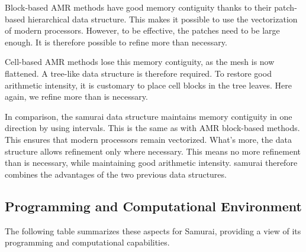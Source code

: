 Block-based AMR methods have good memory contiguity thanks to their patch-based hierarchical data structure. This makes it possible to use the vectorization of modern processors. However, to be effective, the patches need to be large enough. It is therefore possible to refine more than necessary.

Cell-based AMR methods lose this memory contiguity, as the mesh is now flattened. A tree-like data structure is therefore required. To restore good arithmetic intensity, it is customary to place cell blocks in the tree leaves. Here again, we refine more than is necessary.

In comparison, the samurai data structure maintains memory contiguity in one direction by using intervals. This is the same as with AMR block-based methods. This ensures that modern processors remain vectorized. What's more, the data structure allows refinement only where necessary. This means no more refinement than is necessary, while maintaining good arithmetic intensity. samurai therefore combines the advantages of the two previous data structures.

\subsection{Programming and Computational Environment}
\label{sec::Samurai:environment_capabilities}


The following table summarizes these aspects for Samurai, providing a  view of its programming and computational capabilities.

